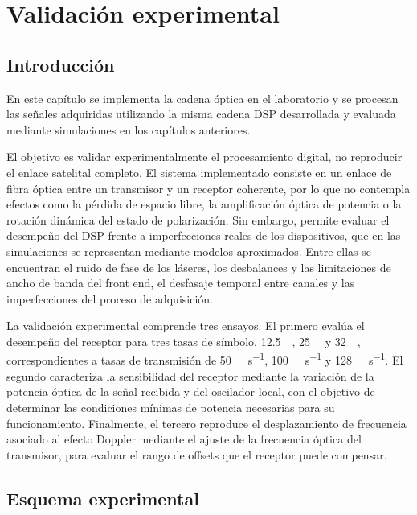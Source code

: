 \chapter{Validaci\'on experimental}
\label{cap:experimental}

\section{Introducci\'on}
\label{sec:exp-intro}

En este cap\'itulo se implementa la cadena \'optica en el laboratorio y se
procesan las se\~nales adquiridas utilizando la misma cadena DSP desarrollada
y evaluada mediante simulaciones en los cap\'itulos anteriores.

El objetivo es validar experimentalmente el procesamiento digital, no
reproducir el enlace satelital completo. El sistema implementado consiste en
un enlace de fibra \'optica entre un transmisor y un receptor coherente, por
lo que no contempla efectos como la p\'erdida de espacio libre, la
amplificaci\'on \'optica de potencia o la rotaci\'on din\'amica del estado de
polarizaci\'on. Sin embargo, permite evaluar el desempe\~no del DSP frente a
imperfecciones reales de los dispositivos, que en las simulaciones se
representan mediante modelos aproximados. Entre ellas se encuentran el ruido
de fase de los l\'aseres, los desbalances y las limitaciones de ancho de banda
del front end, el desfasaje temporal entre canales y las imperfecciones del
proceso de adquisici\'on.

La validaci\'on experimental comprende tres ensayos. El primero eval\'ua el
desempe\~no del receptor para tres tasas de s\'imbolo, \SI{12.5}{\giga\baud},
\SI{25}{\giga\baud} y \SI{32}{\giga\baud}, correspondientes a tasas de
transmisi\'on de \SI{50}{\giga\bit\per\second},
\SI{100}{\giga\bit\per\second} y \SI{128}{\giga\bit\per\second}. El segundo
caracteriza la sensibilidad del receptor mediante la variaci\'on de la
potencia \'optica de la se\~nal recibida y del oscilador local, con el
objetivo de determinar las condiciones m\'inimas de potencia necesarias para
su funcionamiento. Finalmente, el tercero reproduce el desplazamiento de
frecuencia asociado al efecto Doppler mediante el ajuste de la frecuencia
\'optica del transmisor, para evaluar el rango de offsets que el receptor
puede compensar.


\section{Esquema experimental}
\label{sec:exp-banco}

